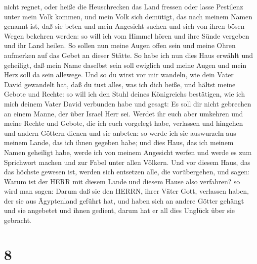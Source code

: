 nicht regnet, oder heiße die Heuschrecken das Land fressen oder lasse
Pestilenz unter mein Volk kommen,  und mein Volk sich
demütigt, das nach meinem Namen genannt ist, daß sie beten und mein
Angesicht suchen und sich von ihren bösen Wegen bekehren werden: so will
ich vom Himmel hören und ihre Sünde vergeben und ihr Land heilen.
 So sollen nun meine Augen offen sein und meine Ohren
aufmerken auf das Gebet an dieser Stätte.  So habe ich nun
dies Haus erwählt und geheiligt, daß mein Name daselbst sein soll
ewiglich und meine Augen und mein Herz soll da sein allewege.
 Und so du wirst vor mir wandeln, wie dein Vater David
gewandelt hat, daß du tust alles, was ich dich heiße, und hältst meine
Gebote und Rechte:  so will ich den Stuhl deines
Königreichs bestätigen, wie ich mich deinem Vater David verbunden habe
und gesagt: Es soll dir nicht gebrechen an einem Manne, der über Israel
Herr sei.  Werdet ihr euch aber umkehren und meine Rechte
und Gebote, die ich euch vorgelegt habe, verlassen und hingehen und
andern Göttern dienen und sie anbeten:  so werde ich sie
auswurzeln aus meinem Lande, das ich ihnen gegeben habe; und dies Haus,
das ich meinem Namen geheiligt habe, werde ich von meinem Angesicht
werfen und werde es zum Sprichwort machen und zur Fabel unter allen
Völkern.  Und vor diesem Haus, das das höchste gewesen ist,
werden sich entsetzen alle, die vorübergehen, und sagen: Warum ist der
HERR mit diesem Lande und diesem Hause also verfahren?  so
wird man sagen: Darum daß sie den HERRN, ihrer Väter Gott, verlassen
haben, der sie aus Ägyptenland geführt hat, und haben sich an andere
Götter gehängt und sie angebetet und ihnen gedient, darum hat er all
dies Unglück über sie gebracht.

\hypertarget{section-7}{%
\section{8}\label{section-7}}

